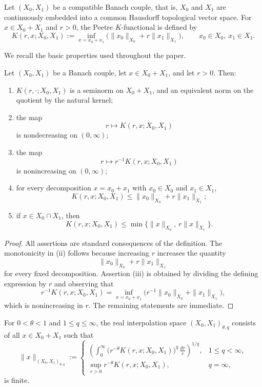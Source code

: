 \documentclass[smallextended,envcountsect,envcountsame]{svjour3}
\begin{document}
	Let $(X_0,X_1)$ be a compatible Banach couple, that is, $X_0$ and $X_1$ are continuously embedded into a common Hausdorff topological vector space. For $x\in X_0+X_1$ and $r>0$, the Peetre $K$-functional is defined by
	\[
	K(r,x;X_0,X_1)
	:=
	\inf_{x=x_0+x_1}
	\bigl(
	\|x_0\|_{X_0}+r\|x_1\|_{X_1}
	\bigr),
	\qquad x_0\in X_0,\ x_1\in X_1.
	\]
	
	We recall the basic properties used throughout the paper.
	
	\begin{proposition}\label{prop:K-basic}
		Let $(X_0,X_1)$ be a Banach couple, let $x\in X_0+X_1$, and let $r>0$. Then:
		
		\begin{enumerate}[label=\textup{(\roman*)}]
			\item $K(r,\cdot;X_0,X_1)$ is a seminorm on $X_0+X_1$, and an equivalent norm on the quotient by the natural kernel;
			
			\item the map
			\[
			r\mapsto K(r,x;X_0,X_1)
			\]
			is nondecreasing on $(0,\infty)$;
			
			\item the map
			\[
			r\mapsto r^{-1}K(r,x;X_0,X_1)
			\]
			is nonincreasing on $(0,\infty)$;
			
			\item for every decomposition $x=x_0+x_1$ with $x_0\in X_0$ and $x_1\in X_1$,
			\[
			K(r,x;X_0,X_1)\le \|x_0\|_{X_0}+r\|x_1\|_{X_1};
			\]
			
			\item if $x\in X_0\cap X_1$, then
			\[
			K(r,x;X_0,X_1)\le \min\{\|x\|_{X_0},\,r\|x\|_{X_1}\}.
			\]
		\end{enumerate}
	\end{proposition}
	
	\begin{proof}
		All assertions are standard consequences of the definition. The monotonicity in \textup{(ii)} follows because increasing $r$ increases the quantity
		\[
		\|x_0\|_{X_0}+r\|x_1\|_{X_1}
		\]
		for every fixed decomposition. Assertion \textup{(iii)} is obtained by dividing the defining expression by $r$ and observing that
		\[
		r^{-1}K(r,x;X_0,X_1)
		=
		\inf_{x=x_0+x_1}
		\bigl(
		r^{-1}\|x_0\|_{X_0}+\|x_1\|_{X_1}
		\bigr),
		\]
		which is nonincreasing in $r$. The remaining statements are immediate.
	\end{proof}
	
	For $0<\theta<1$ and $1\le q\le\infty$, the real interpolation space $(X_0,X_1)_{\theta,q}$ consists of all $x\in X_0+X_1$ such that
	\[
	\|x\|_{(X_0,X_1)_{\theta,q}}
	:=
	\begin{cases}
		\left(
		\displaystyle\int_0^\infty
		\bigl(r^{-\theta}K(r,x;X_0,X_1)\bigr)^q
		\,\frac{dr}{r}
		\right)^{1/q},
		& 1\le q<\infty,\\[2ex]
		\displaystyle\sup_{r>0} r^{-\theta}K(r,x;X_0,X_1),
		& q=\infty,
	\end{cases}
	\]
	is finite.
	
\end{document}
